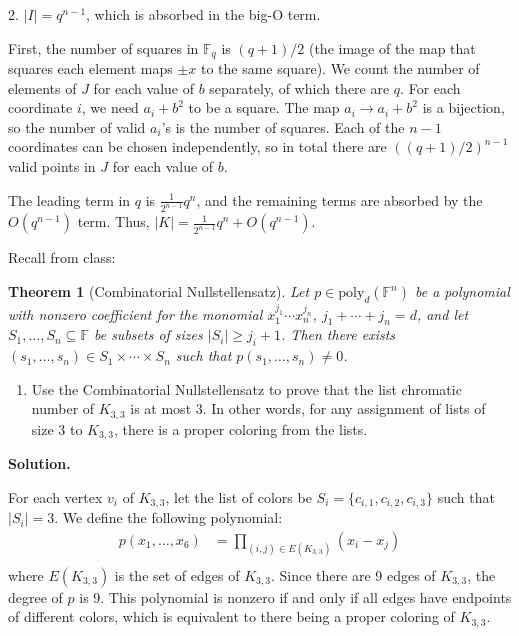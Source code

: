 \documentclass[11pt,letterpaper]{article}
\newtheorem{theorem}{Theorem}[section]
\theoremstyle{definition}
\newcommand{\solution}{\medskip\noindent\textbf{Solution.}\par\medskip}
\begin{document}
2.
$|I| = q^{n-1}$, which is absorbed in the big-O term. 

First, the number of squares in $\mathbb{F}_q$ is $(q+1)/2$ (the image of the map that squares each element maps $\pm x$ to the same square).
We count the number of elements of $J$ for each value of $b$ separately, of which there are $q$.
For each coordinate $i$, we need $a_i + b^2$ to be a square.
The map $a_i\to a_i+b^2$ is a bijection, so the number of valid $a_i$'s is the number of squares.
Each of the $n-1$ coordinates can be chosen independently, so in total there are $((q+1)/2)^{n-1}$ valid points in $J$ for each value of $b$.

The leading term in $q$ is $\frac{1}{2^{n-1}} q^n$, and the remaining terms are absorbed by the $O(q^{n-1})$ term.
Thus, $|K| = \frac{1}{2^{n-1}} q^n + O(q^{n-1})$.


\medskip
\noindent Recall from class:

\begin{theorem}[Combinatorial Nullstellensatz]\label{thm:nullstellensatz}
Let $p \in \mathrm{poly}_d(\mathbb{F}^n)$ be a polynomial with nonzero coefficient for the monomial $x_1^{j_1} \cdots x_n^{j_n}$, $j_1 + \cdots + j_n = d$, and let $S_1, \dots, S_n \subseteq \mathbb{F}$ be subsets of sizes $|S_i| \geq j_i + 1$. Then there exists $(s_1, \dots, s_n) \in S_1 \times \cdots \times S_n$ such that $p(s_1, \dots, s_n) \neq 0$.
\end{theorem}

\begin{enumerate}[resume=q]
\item Use the Combinatorial Nullstellensatz to prove that the list chromatic number of $K_{3,3}$ is at most $3$. In other words, for any assignment of lists of size $3$ to $K_{3,3}$, there is a proper coloring from the lists.
\end{enumerate}

\solution

For each vertex $v_i$ of $K_{3,3}$, let the list of colors be $S_i = \{c_{i,1},c_{i,2},c_{i,3}\}$ such that $|S_i| = 3$.
We define the following polynomial:
\begin{align*}
    p(x_1,\dots,x_6) &= \prod_{(i,j)\in E(K_{3,3})} (x_i - x_j) \\
\end{align*}
where $E(K_{3,3})$ is the set of edges of $K_{3,3}$.
Since there are 9 edges of $K_{3,3}$, the degree of $p$ is 9.
This polynomial is nonzero if and only if all edges have endpoints of different colors, which is equivalent to there being a proper coloring of $K_{3,3}$.
\end{document}
